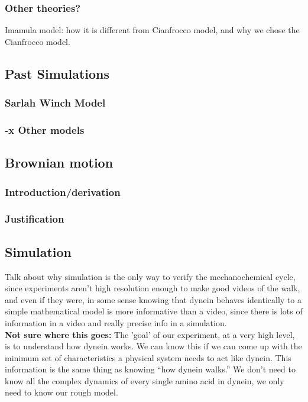 \documentclass[10pt]{article} %
\begin{document}
\subsubsection{Other theories?}
Imamula model: how it is different from Cianfrocco model, and why we chose the Cianfrocco model.\\
	\subsection{Past Simulations}
		\subsubsection{Sarlah Winch Model}
		\subsubsection{-x Other models}
	\subsection{Brownian motion}
                \subsubsection{Introduction/derivation}
                \subsubsection{Justification}

\subsection{Simulation}
Talk about why simulation is the only way to verify the mechanochemical cycle, since experiments
aren't high resolution enough to make good videos of the walk, and even if they were, in some sense
knowing that dynein behaves identically to a simple mathematical model is more informative than
a video, since there is lots of information in a video and really precise info in a simulation.\\

\textbf{Not sure where this goes:} The 'goal' of our experiment, at a very high level, is to
understand how dynein works. We can know this if we can come up with the minimum set of characteristics a physical system needs to act like dynein. This information is the same thing as knowing
``how dynein walks.'' We don't need to know all the complex dynamics of every single amino acid in
dynein, we only need to know our rough model.\\
\end{document}
